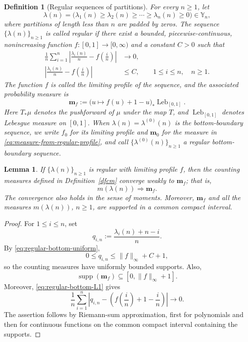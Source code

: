 \documentclass[11pt]{amsart}
\theoremstyle{plain}
\newtheorem{definition}[theorem]{Definition}
\newtheorem{lemma}[theorem]{Lemma}
\newcommand\YY{{\mathbb {Y}}}
\numberwithin{equation}{section}
\numberwithin{theorem}{section}
\numberwithin{figure}{section}
\begin{document}
\begin{definition}[Regular sequences of partitions]
\label{def:regular-bottom}
For every $n\geq1$, let
\[
    \lambda(n)
    =
    \bigl(\lambda_1(n)\geq\lambda_2(n)\geq\cdots\geq
    \lambda_n(n)\geq0\bigr)
    \in\YY_n,
\]
where partitions of length less than $n$ are padded by zeros. The
sequence $\{\lambda(n)\}_{n\geq1}$ is called \emph{regular} if there
exist a bounded, piecewise-continuous, nonincreasing function
$f:[0,1]\to[0,\infty)$ and a constant $C>0$ such that
\begin{align}
    \frac1n\sum_{i=1}^n
    \left|
        \frac{\lambda_i(n)}n-f\left(\frac{i}{n}\right)
    \right|
    &\longrightarrow0,
    \label{eq:regular-bottom-L1}\\
    \left|
        \frac{\lambda_i(n)}n-f\left(\frac{i}{n}\right)
    \right|
    &\leq C,
    \qquad 1\leq i\leq n,\quad n\geq1.
    \label{eq:regular-bottom-uniform}
\end{align}
The function $f$ is called the limiting profile of the sequence, and
the associated probability measure is
\begin{equation}
    \mathbf m_f
    :=
    \bigl(u\mapsto f(u)+1-u\bigr)_*
    \operatorname{Leb}_{[0,1]}.
    \label{eq:measure-from-regular-profile}
\end{equation}
Here $T_*\mu$ denotes the pushforward of $\mu$ under the map $T$, and
$\operatorname{Leb}_{[0,1]}$ denotes Lebesgue measure on $[0,1]$.
When $\lambda(n)=\lambda^{(0)}(n)$ is the bottom-boundary sequence, we
write $f_0$ for its limiting profile and $\mathbf m_0$ for the measure
in \eqref{eq:measure-from-regular-profile}, and call
$\{\lambda^{(0)}(n)\}_{n\geq1}$ a regular bottom-boundary sequence.
\end{definition}

\begin{lemma}
\label{lem:regular-implies-moment-convergence}
If $\{\lambda(n)\}_{n\geq1}$ is regular with limiting profile $f$, then
the counting measures defined in Definition~\ref{dfcm} converge weakly to
$\mathbf m_f$; that is,
\[
    m(\lambda(n))\Longrightarrow\mathbf m_f.
\]
The convergence also holds in the sense of moments. Moreover,
$\mathbf m_f$ and all the measures $m(\lambda(n))$, $n\geq1$, are
supported in a common compact interval.
\end{lemma}

\begin{proof}
For $1\leq i\leq n$, set
\[
    q_{i,n}:=\frac{\lambda_i(n)+n-i}{n}.
\]
By \eqref{eq:regular-bottom-uniform},
\[
    0\leq q_{i,n}\leq \lVert f\rVert_\infty+C+1,
\]
so the counting measures have uniformly bounded supports. Also,
\[
    \operatorname{supp}(\mathbf m_f)
    \subseteq[0,\lVert f\rVert_\infty+1].
\]
Moreover,
\eqref{eq:regular-bottom-L1} gives
\[
    \frac1n\sum_{i=1}^n
    \left|
        q_{i,n}-\left(f\left(\frac{i}{n}\right)+1-\frac{i}{n}\right)
    \right|
    \longrightarrow0.
\]
The assertion follows by Riemann-sum approximation, first for
polynomials and then for continuous functions on the common compact
interval containing the supports.
\end{proof}
\end{document}
